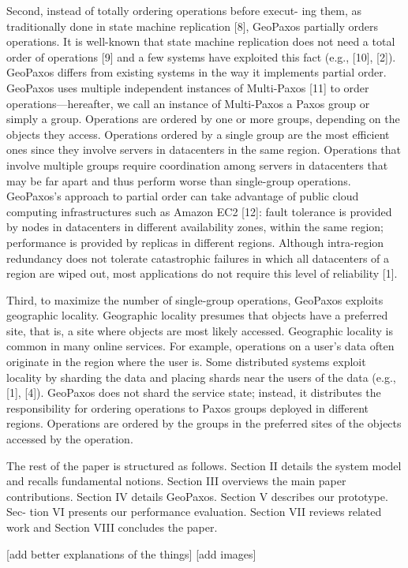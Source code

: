 Second, instead of totally ordering operations before execut- ing them, as traditionally done in state machine replication [8], GeoPaxos partially orders operations. It is well-known that state machine replication does not need a total order of operations [9] and a few systems have exploited this fact (e.g., [10], [2]). GeoPaxos differs from existing systems in the way it implements partial order. GeoPaxos uses multiple independent instances of Multi-Paxos [11] to order operations—hereafter, we call an instance of Multi-Paxos a Paxos group or simply a group. Operations are ordered by one or more groups, depending on the objects they access. Operations ordered by a single group are the most efficient ones since they involve servers in datacenters in the same region. Operations that involve multiple groups require coordination among servers in datacenters that may be far apart and thus perform worse than single-group operations. GeoPaxos’s approach to partial order can take advantage of public cloud computing infrastructures such as Amazon EC2 [12]: fault tolerance is provided by nodes in datacenters in different availability zones, within the same region; performance is provided by replicas in different regions. Although intra-region redundancy does not tolerate catastrophic failures in which all datacenters of a region are wiped out, most applications do not require this level of reliability [1].

Third, to maximize the number of single-group operations, GeoPaxos exploits geographic locality. Geographic locality presumes that objects have a preferred site, that is, a site where objects are most likely accessed. Geographic locality is common in many online services. For example, operations on a user’s data often originate in the region where the user is. Some distributed systems exploit locality by sharding the data and placing shards near the users of the data (e.g., [1], [4]). GeoPaxos does not shard the service state; instead, it distributes the responsibility for ordering operations to Paxos groups deployed in different regions. Operations are ordered by the groups in the preferred sites of the objects accessed by the operation.

The rest of the paper is structured as follows. Section II details the system model and recalls fundamental notions. Section III overviews the main paper contributions. Section IV
details GeoPaxos. Section V describes our prototype. Sec- tion VI presents our performance evaluation. Section VII reviews related work and Section VIII concludes the paper.

[add better explanations of the things]
[add images]